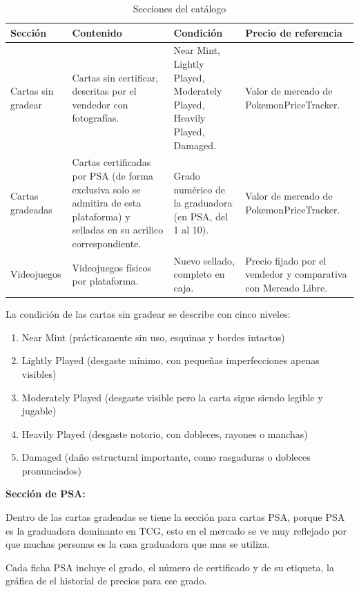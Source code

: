 \documentclass[letterpaper,11pt]{article}
\begin{document}
\begin{table}[H]
\centering
\small
\begin{tabularx}{\textwidth}{|l|Y|Y|Y|}
\hline
\textbf{Sección} & \textbf{Contenido} & \textbf{Condición} & \textbf{Precio de referencia} \\ \hline
Cartas sin gradear & Cartas sin certificar, descritas por el vendedor con fotografías. & Near Mint, Lightly Played, Moderately Played, Heavily Played, Damaged. & Valor de mercado de PokemonPriceTracker. \\ \hline
Cartas gradeadas & Cartas certificadas por PSA (de forma exclusiva solo se admitira de esta plataforma) 
y selladas en su acrilico correspondiente. & Grado numérico de la graduadora (en PSA, del 1 al 10). & Valor de mercado de PokemonPriceTracker. \\ \hline
Videojuegos & Videojuegos físicos por plataforma. & Nuevo sellado, completo en caja. & Precio fijado por el vendedor y comparativa con Mercado Libre. \\ \hline
\end{tabularx}
\caption{Secciones del catálogo}
\end{table}

\newpage
La condición de las cartas sin gradear se describe con cinco niveles:

\begin{enumerate}
    \item Near Mint (prácticamente sin uso, esquinas y bordes intactos)
    \item Lightly Played (desgaste mínimo, con pequeñas imperfecciones apenas visibles)
    \item Moderately Played (desgaste visible pero la carta sigue siendo legible y jugable)
    \item Heavily Played (desgaste notorio, con dobleces, rayones o manchas)
    \item Damaged (daño estructural importante, como rasgaduras o dobleces pronunciados)
\end{enumerate}

\textbf{Sección de PSA:} 

Dentro de las cartas gradeadas se tiene la sección 
para cartas PSA, 
porque PSA es la graduadora dominante en TCG, esto en el mercado se ve muy reflejado por que 
muchas personas es la casa graduadora que mas se utiliza.

Cada ficha PSA incluye el grado, el número de certificado y de su etiqueta, la gráfica de el historial de precios para ese grado.
\end{document}
